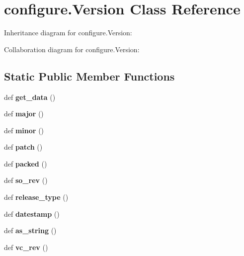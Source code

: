 \hypertarget{classconfigure_1_1_version}{}\section{configure.\+Version Class Reference}
\label{classconfigure_1_1_version}


Inheritance diagram for configure.\+Version\+:


Collaboration diagram for configure.\+Version\+:
\subsection*{Static Public Member Functions}
\begin{DoxyCompactItemize}
\item 
\mbox{\label{classconfigure_1_1_version_a5080a2760040cdc56b098bb6da1cf7c2}} 
def {\bfseries get\+\_\+data} ()
\item 
\mbox{\label{classconfigure_1_1_version_a3d162a1aac2d922d2f7c55c06629195f}} 
def {\bfseries major} ()
\item 
\mbox{\label{classconfigure_1_1_version_a87887c6ea4fd5b612e261a9a5bbaf601}} 
def {\bfseries minor} ()
\item 
\mbox{\label{classconfigure_1_1_version_a944a3515c749d980d46b2c26a2a9ec99}} 
def {\bfseries patch} ()
\item 
\mbox{\label{classconfigure_1_1_version_ab95bce41964bef60174b52ed84c748f1}} 
def {\bfseries packed} ()
\item 
\mbox{\label{classconfigure_1_1_version_af199d56bed506df46adf9e0f55622cd8}} 
def {\bfseries so\+\_\+rev} ()
\item 
\mbox{\label{classconfigure_1_1_version_a995eddffd86ff4fd442c341ac194a525}} 
def {\bfseries release\+\_\+type} ()
\item 
\mbox{\label{classconfigure_1_1_version_a1d36a94247bb8656ecb1cee4fb889e37}} 
def {\bfseries datestamp} ()
\item 
\mbox{\label{classconfigure_1_1_version_a9745e3df2041b387bf41f07c860e38ef}} 
def {\bfseries as\+\_\+string} ()
\item 
\mbox{\label{classconfigure_1_1_version_abb2af4a4e2e78a6782a9147e7e0e1579}} 
def {\bfseries vc\+\_\+rev} ()
\end{DoxyCompactItemize}
